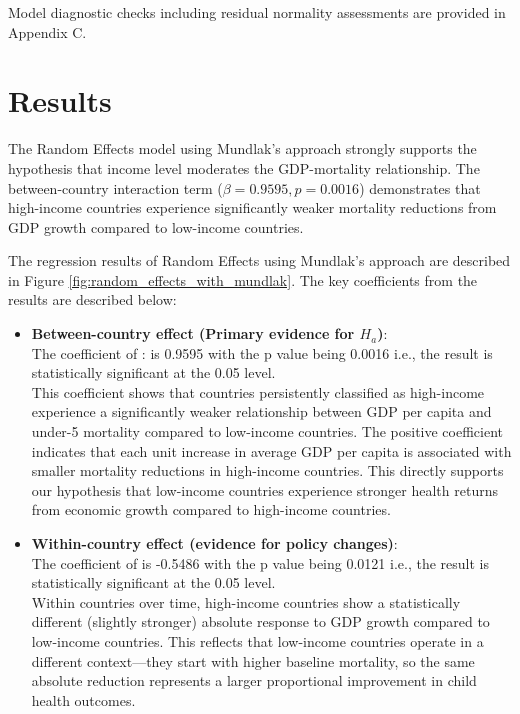 \documentclass[10pt,a4paper]{article}
\begin{document}
Model diagnostic checks including residual normality assessments are provided in Appendix C.

\section{Results}

The Random Effects model using Mundlak's approach strongly supports the hypothesis that income level moderates the GDP-mortality relationship. The between-country interaction term ($\beta = 0.9595, p = 0.0016$) demonstrates that high-income countries experience significantly weaker mortality reductions from GDP growth compared to low-income countries.

The regression results of Random Effects using Mundlak's approach are described in Figure \ref{fig:random_effects_with_mundlak}. The key coefficients from the results are described below:

\begin{itemize}
    \item \textbf{Between-country effect (Primary evidence for $H_{a}$)}:
    \\
    The coefficient of : is 0.9595 with the p value being 0.0016 i.e., the result is statistically significant at the 0.05 level.
    \\
    This coefficient shows that countries persistently classified as high-income experience a significantly weaker relationship between GDP per capita and under-5 mortality compared to low-income countries. The positive coefficient indicates that each unit increase in average GDP per capita is associated with smaller mortality reductions in high-income countries. This directly supports our hypothesis that low-income countries experience stronger health returns from economic growth compared to high-income countries.
    
    \item \textbf{Within-country effect (evidence for policy changes)}:
    \\ The coefficient of  is -0.5486 with the p value being 0.0121 i.e., the result is statistically significant at the 0.05 level.
    \\
    Within countries over time, high-income countries show a statistically different (slightly stronger) absolute response to GDP growth compared to low-income countries. This reflects that low-income countries operate in a different context—they start with higher baseline mortality, so the same absolute reduction represents a larger proportional improvement in child health outcomes.
    \end{itemize}
    
\end{document}

